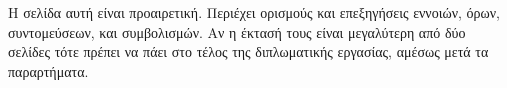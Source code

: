 \chapter*{\glossaryname}
\addstarredchapter{\glossaryname} %

Η σελίδα αυτή είναι προαιρετική.
Περιέχει ορισμούς και επεξηγήσεις εννοιών, όρων, συντομεύσεων, και συμβολισμών.
Αν η έκτασή τους είναι μεγαλύτερη από δύο σελίδες τότε πρέπει να πάει στο τέλος της διπλωματικής εργασίας, αμέσως μετά τα παραρτήματα.